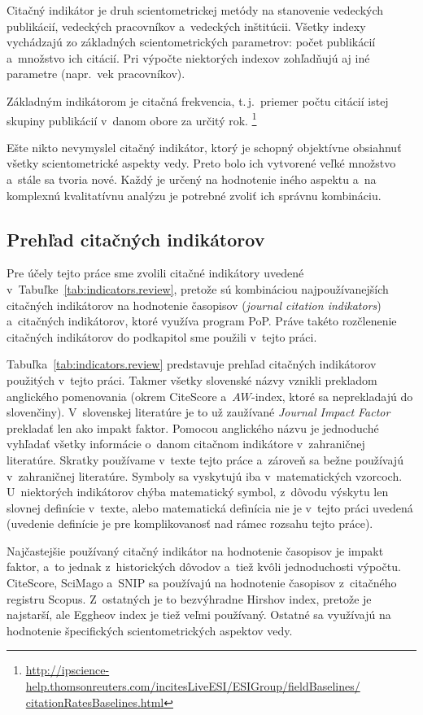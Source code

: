 Citačný indikátor je druh scientometrickej metódy na stanovenie 
vedeckých publikácií, vedeckých pracovníkov a~vedeckých inštitúcii.  Všetky
indexy vychádzajú zo základných scientometrických parametrov: počet publikácií
a~množstvo ich citácií.  Pri výpočte niektorých indexov zohľadňujú aj iné
parametre (napr.~vek pracovníkov).

Základným indikátorom je citačná frekvencia, t.\,j.~priemer počtu citácií istej
skupiny publikácií v~danom obore za určitý rok.%
\footnote{\url{http://ipscience-help.thomsonreuters.com/incitesLiveESI/ESIGroup/fieldBaselines/
    citationRatesBaselines.html}}

Ešte nikto nevymyslel citačný indikátor, ktorý je schopný objektívne obsiahnuť
všetky scientometrické aspekty vedy.  Preto bolo ich vytvorené veľké množstvo
a~stále sa tvoria nové.  Každý je určený na hodnotenie iného aspektu a~na
komplexnú kvalitatívnu analýzu je potrebné zvoliť ich správnu kombináciu.

\subsection{Prehľad citačných indikátorov}

Pre účely tejto práce sme zvolili citačné indikátory uvedené
v~Tabuľke~\ref{tab:indicators.review}, pretože sú kombináciou najpoužívanejších
citačných indikátorov na hodnotenie časopisov (\emph{journal citation
  indikators}) a~citačných indikátorov, ktoré využíva program PoP.  Práve takéto rozčlenenie citačných indikátorov do podkapitol sme
použili v~tejto práci.

Tabuľka~\ref{tab:indicators.review} predstavuje prehľad citačných indikátorov
použitých v~tejto práci.  Takmer všetky slovenské názvy vznikli prekladom
anglického pomenovania (okrem CiteScore a~$AW$-index, ktoré sa neprekladajú do
slovenčiny).  V~slovenskej literatúre je to už zaužívané \emph{Journal Impact
  Factor} prekladať len ako impakt faktor.  Pomocou anglického názvu je
jednoduché vyhľadať všetky informácie o~danom citačnom indikátore v~zahraničnej
literatúre.  Skratky používame v~texte tejto práce a~zároveň sa bežne používajú
v~zahraničnej literatúre.  Symboly sa vyskytujú iba v~matematických vzorcoch.
U~niektorých indikátorov chýba matematický symbol, z~dôvodu výskytu len slovnej
definície v~texte, alebo matematická definícia nie je v~tejto práci uvedená
(uvedenie definície je pre komplikovanosť nad rámec rozsahu tejto práce).

Najčastejšie používaný citačný indikátor na hodnotenie časopisov je impakt
faktor, a~to jednak z~historických dôvodov a~tiež kvôli jednoduchosti výpočtu.
CiteScore, SciMago a~SNIP sa používajú na hodnotenie časopisov z~citačného
registru Scopus.  Z~ostatných je to bezvýhradne Hirshov index, pretože je
najstarší, ale Eggheov index je tiež veľmi používaný.  Ostatné sa využívajú na
hodnotenie špecifických scientometrických aspektov vedy.

